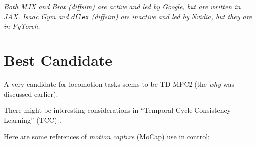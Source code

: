 \documentclass[12pt,a4paper]{article}
\begin{document}
\emph{Both MJX and Brax (diffsim) are active and led by Google, but are written in JAX.
Isaac Gym and \texttt{dflex} (diffsim) are inactive and led by Nvidia, but they are in PyTorch.}

\section{Best Candidate}
\label{s:best}

A very candidate for locomotion tasks seems to be TD-MPC2 \cite{Hansen2024-ld}
(the \emph{why} was discussed earlier).

There might be interesting considerations in
``Temporal Cycle-Consistency Learning'' (TCC) \cite{Dwibedi2019-jv}.

Here are some references of \emph{motion capture} (MoCap) use in control:
\cite{Merel2017-lo, Merel2019-rn, Merel2020-ea, La_Barbera2021-kq, Fussell2021-uf, Bohez2022-jt,
Liu2022-lw, Winkler2022-nr, Sun2023-bl, Radosavovic2024-xl}

\begin{comment}
check previous note
\end{comment}


\end{document}
